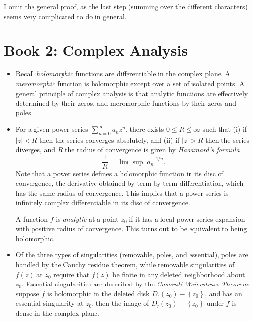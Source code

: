 \documentclass[11pt,
        usenames, %
        dvipsnames %
    ]{report}
\newcommand*{\abs}[1]{\left|#1\right|}
\newcommand*{\z}[1]{\left\{#1\right\}}
\begin{document}
\begin{itemize}
\begin{itemize}
                I omit the general proof, as the last step (summing over the
                different characters) seems very complicated to do in general.
        \end{itemize}
\end{itemize}

\section{Book 2: Complex Analysis}

\begin{itemize}
    \item Recall \emph{holomorphic} functions are differentiable in the
        complex plane. A \emph{meromorphic} function is holomorphic except over
        a set of isolated points. A general principle of complex analysis is
        that analytic functions are effectively determined by their zeros, and
        meromorphic functions by their zeros and poles.

    \item For a given power series $\sum\limits_{n = 0}^\infty a_nz^n$, there
        exists $0 \leq R \leq \infty$ such that (i) if $\abs{z} < R$ then the
        series converges absolutely, and (ii) if $\abs{z} > R$ then the series
        diverges, and $R$ the radius of convergence is given by \emph{Hadamard's
        formula}
        \begin{equation}
            \frac{1}{R} = \lim \sup \abs{a_n}^{1/n}.
        \end{equation}
        Note that a power series defines a holomorphic function in its disc of
        convergence, the derivative obtained by term-by-term differentiation,
        which has the same radius of convergence. This implies that a power
        series is infinitely complex differentiable in its disc of convergence.

        A function $f$ is \emph{analytic} at a point $z_0$ if it has a local
        power series expansion with positive radius of convergence. This turns
        out to be equivalent to being holomorphic.

    \item Of the three types of singularities (removable, poles, and essential),
        poles are handled by the Cauchy residue theorem, while removable
        singularities of $f(z)$ at $z_0$ require that $f(z)$ be finite in any
        deleted neighborhood about $z_0$. Essential singularities are described
        by the \emph{Casorati-Weierstrass Theorem}: suppose $f$ is holomorphic
        in the deleted disk $D_r(z_0) - \z{z_0}$, and has an essential
        singularity at $z_0$, then the image of $D_r(z_0) - \z{z_0}$ under $f$
        is dense in the complex plane.


\end{itemize}
\end{document}

